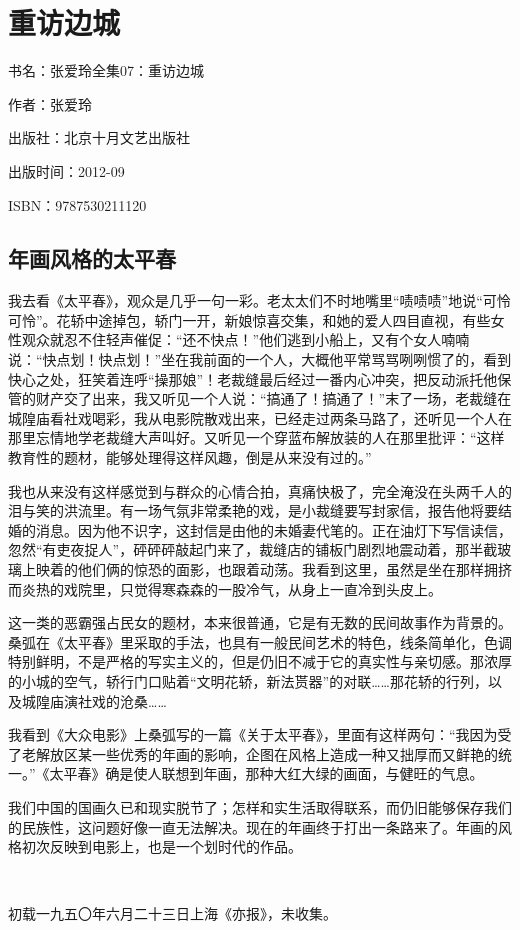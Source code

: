 


\section{重访边城}


\par 书名：张爱玲全集07：重访边城
\par 作者：张爱玲
\par 出版社：北京十月文艺出版社
\par 出版时间：2012-09
\par ISBN：9787530211120








\subsection{年画风格的太平春}


\par 我去看《太平春》，观众是几乎一句一彩。老太太们不时地嘴里“啧啧啧”地说“可怜可怜”。花轿中途掉包，轿门一开，新娘惊喜交集，和她的爱人四目直视，有些女性观众就忍不住轻声催促：“还不快点！”他们逃到小船上，又有个女人喃喃说：“快点划！快点划！”坐在我前面的一个人，大概他平常骂骂咧咧惯了的，看到快心之处，狂笑着连呼“操那娘”！老裁缝最后经过一番内心冲突，把反动派托他保管的财产交了出来，我又听见一个人说：“搞通了！搞通了！”末了一场，老裁缝在城隍庙看社戏喝彩，我从电影院散戏出来，已经走过两条马路了，还听见一个人在那里忘情地学老裁缝大声叫好。又听见一个穿蓝布解放装的人在那里批评：“这样教育性的题材，能够处理得这样风趣，倒是从来没有过的。”
\par 我也从来没有这样感觉到与群众的心情合拍，真痛快极了，完全淹没在头两千人的泪与笑的洪流里。有一场气氛非常柔艳的戏，是小裁缝要写封家信，报告他将要结婚的消息。因为他不识字，这封信是由他的未婚妻代笔的。正在油灯下写信读信，忽然“有吏夜捉人”，砰砰砰敲起门来了，裁缝店的铺板门剧烈地震动着，那半截玻璃上映着的他们俩的惊恐的面影，也跟着动荡。我看到这里，虽然是坐在那样拥挤而炎热的戏院里，只觉得寒森森的一股冷气，从身上一直冷到头皮上。
\par 这一类的恶霸强占民女的题材，本来很普通，它是有无数的民间故事作为背景的。桑弧在《太平春》里采取的手法，也具有一般民间艺术的特色，线条简单化，色调特别鲜明，不是严格的写实主义的，但是仍旧不减于它的真实性与亲切感。那浓厚的小城的空气，轿行门口贴着“文明花轿，新法贳器”的对联……那花轿的行列，以及城隍庙演社戏的沧桑……
\par 我看到《大众电影》上桑弧写的一篇《关于太平春》，里面有这样两句：“我因为受了老解放区某一些优秀的年画的影响，企图在风格上造成一种又拙厚而又鲜艳的统一。”《太平春》确是使人联想到年画，那种大红大绿的画面，与健旺的气息。
\par 我们中国的国画久已和现实脱节了；怎样和实生活取得联系，而仍旧能够保存我们的民族性，这问题好像一直无法解决。现在的年画终于打出一条路来了。年画的风格初次反映到电影上，也是一个划时代的作品。
\par  
\par *初载一九五〇年六月二十三日上海《亦报》，未收集。



